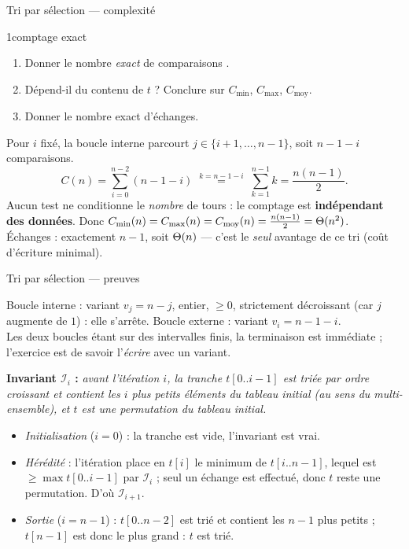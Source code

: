 \documentclass[11pt,aspectratio=169]{beamer}
\begin{document}
\begin{frame}[fragile,shrink=15]{Tri par sélection --- complexité}
\begin{exercice}{1}{comptage exact}
\begin{enumerate}\setlength\itemsep{1pt}
  \item Donner le nombre \emph{exact} de comparaisons .
  \item Dépend-il du contenu de $t$ ? Conclure sur $C_{\min}$, $C_{\max}$, $C_{\text{moy}}$.
  \item Donner le nombre exact d'échanges.
\end{enumerate}
\end{exercice}
\pause
\begin{soluce}
\small
Pour $i$ fixé, la boucle interne parcourt $j\in\{i+1,\dots,n-1\}$, soit $n-1-i$ comparaisons.
\[
C(n)=\sum_{i=0}^{n-2}(n-1-i)\;\overset{k=n-1-i}{=}\;\sum_{k=1}^{n-1}k=\frac{n(n-1)}2 .
\]
Aucun test ne conditionne le \emph{nombre} de tours : le comptage est \textbf{indépendant
des données}. Donc
$C_{\min}(n)=C_{\max}(n)=C_{\text{moy}}(n)=\frac{n(n-1)}2=\Theta(n^2)$.\\[2pt]
Échanges : exactement $n-1$, soit $\Theta(n)$ --- c'est le \emph{seul} avantage de ce tri
(coût d'écriture minimal).
\end{soluce}
\end{frame}

\begin{frame}[shrink=15]{Tri par sélection --- preuves}
\begin{terminaisonit}
Boucle interne : variant $v_j=n-j$, entier, $\ge 0$, strictement décroissant (car $j$
augmente de $1$) : elle s'arrête. Boucle externe : variant $v_i=n-1-i$. \\
Les deux boucles étant  sur des intervalles finis, la terminaison est immédiate ;
l'exercice est de savoir l'\emph{écrire} avec un variant.
\end{terminaisonit}
\vspace{3pt}
\begin{correction}
\small
\textbf{Invariant $\mathcal I_i$ :} \emph{avant l'itération $i$, la tranche $t[0..i-1]$ est
triée par ordre croissant et contient les $i$ plus petits éléments du tableau initial
(au sens du multi-ensemble), et $t$ est une permutation du tableau initial.}
\begin{itemize}\setlength\itemsep{1pt}
  \item \emph{Initialisation} ($i=0$) : la tranche est vide, l'invariant est vrai.
  \item \emph{Hérédité} : l'itération place en $t[i]$ le minimum de $t[i..n-1]$, lequel est
        $\ge\max t[0..i-1]$ par $\mathcal I_i$ ; seul un échange est effectué, donc $t$ reste
        une permutation. D'où $\mathcal I_{i+1}$.
  \item \emph{Sortie} ($i=n-1$) : $t[0..n-2]$ est trié et contient les $n-1$ plus petits ;
        $t[n-1]$ est donc le plus grand : $t$ est trié.
\end{itemize}
\end{correction}
\end{frame}
\end{document}
